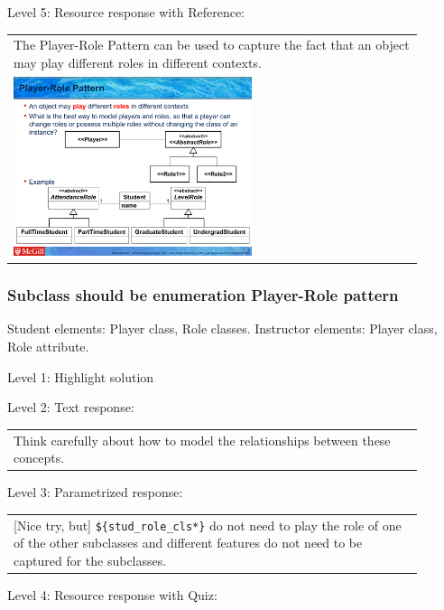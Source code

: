 \noindent Level 5: Resource response with Reference: \medskip

\begin{tabular}{|p{0.9\linewidth}}
The Player-Role Pattern can be used to capture the fact that an object may play different roles
in different contexts.

\\
\includegraphics[width=0.6\textwidth]{images/player_role.png}
\end{tabular} \medskip


\subsubsection{Subclass should be enumeration Player-Role pattern}

Student elements: Player class, Role classes. Instructor elements: Player class, Role attribute. \medskip

\noindent Level 1: Highlight solution  \medskip

\noindent Level 2: Text response: \medskip

\begin{tabular}{|p{0.9\linewidth}}
Think carefully about how to model the relationships between these concepts.
\end{tabular} \medskip

\noindent Level 3: Parametrized response: \medskip

\begin{tabular}{|p{0.9\linewidth}}
[Nice try, but] \verb|${stud_role_cls*}| do not need to play the role of one of the other subclasses and different features do not need to be captured for the subclasses.
\end{tabular} \medskip

\noindent Level 4: Resource response with Quiz: \medskip


